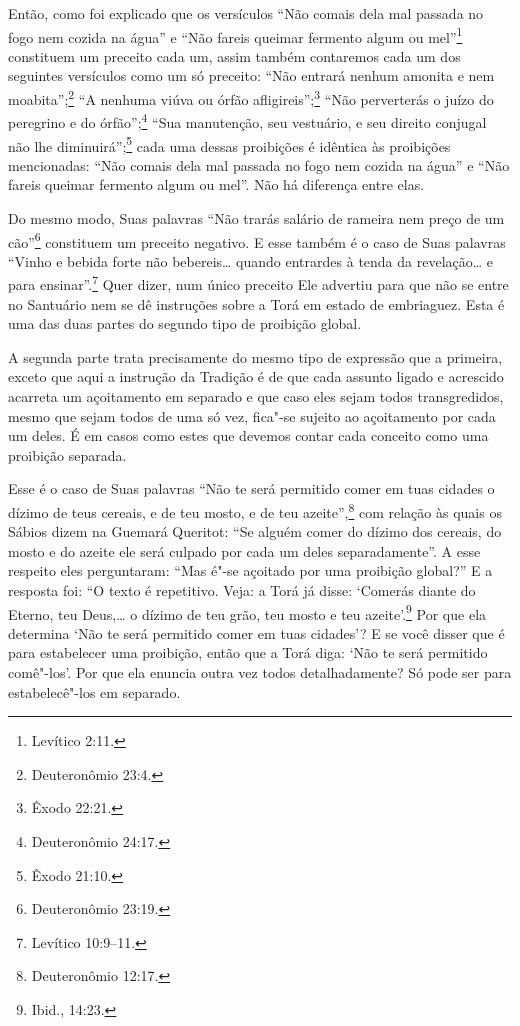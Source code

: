 Então, como foi explicado que os versículos ``Não comais dela mal
passada no fogo nem cozida na água'' e ``Não fareis queimar fermento
algum ou mel''\footnote{Levítico 2:11.} constituem um preceito cada um, assim
também contaremos cada um dos seguintes versículos como um só preceito:
``Não entrará nenhum amonita\starr{} e nem moabita\starr'';\footnote{Deuteronômio 23:4.} ``A
nenhuma viúva ou órfão afligireis'';\footnote{Êxodo 22:21.} ``Não perverterás o
juízo do peregrino e do órfão'';\footnote{Deuteronômio 24:17.} ``Sua
manutenção, seu vestuário, e seu direito conjugal não lhe diminuirá'';\footnote{Êxodo 21:10.} cada uma dessas proibições é idêntica às proibições
mencionadas: ``Não comais dela mal passada no fogo nem cozida na água''
e ``Não fareis queimar fermento algum ou mel''. Não há diferença entre
elas.

Do mesmo modo, Suas palavras ``Não trarás salário de rameira nem preço
de um cão''\footnote{Deuteronômio 23:19.} constituem um preceito negativo. E esse
também é o caso de Suas palavras ``Vinho e bebida forte não bebereis\ldots{}
quando entrardes à tenda da revelação\ldots{} e para ensinar''.\footnote{Levítico
10:9--11.} Quer dizer, num único preceito Ele advertiu para que não se
entre no Santuário nem se dê instruções sobre a Torá\starr{} em estado de
embriaguez. Esta é uma das duas partes do segundo tipo de proibição
global.

A segunda parte trata precisamente do mesmo tipo de expressão que a
primeira, exceto que aqui a instrução da Tradição é de que cada assunto
ligado e acrescido acarreta um açoitamento em separado e que caso eles
sejam todos transgredidos, mesmo que sejam todos de uma só vez, fica"-se
sujeito ao açoitamento por cada um deles. É em casos como estes que
devemos contar cada conceito como uma proibição separada.



Esse é o caso de Suas palavras ``Não te será permitido comer em tuas
cidades o dízimo de teus cereais, e de teu mosto, e de teu azeite'',\footnote{Deuteronômio 12:17.} com relação às quais os Sábios dizem na Guemará\starr{}
Queritot\starr: ``Se alguém comer do dízimo dos cereais, do mosto e do azeite
ele será culpado por cada um deles separadamente''. A esse respeito eles
perguntaram: ``Mas é"-se açoitado por uma proibição global?'' E a
resposta foi: ``O texto é repetitivo. Veja: a Torá\starr{} já disse: `Comerás
diante do Eterno, teu Deus,\ldots{} o dízimo de teu grão, teu mosto e teu
azeite'.\footnote{Ibid., 14:23.} Por que ela determina `Não te será permitido
comer em tuas cidades'? E se você disser que é para estabelecer uma
proibição, então que a Torá\starr{} diga: `Não te será permitido comê"-los'.
Por que ela enuncia outra vez todos detalhadamente? Só pode ser para
estabelecê"-los em separado.

